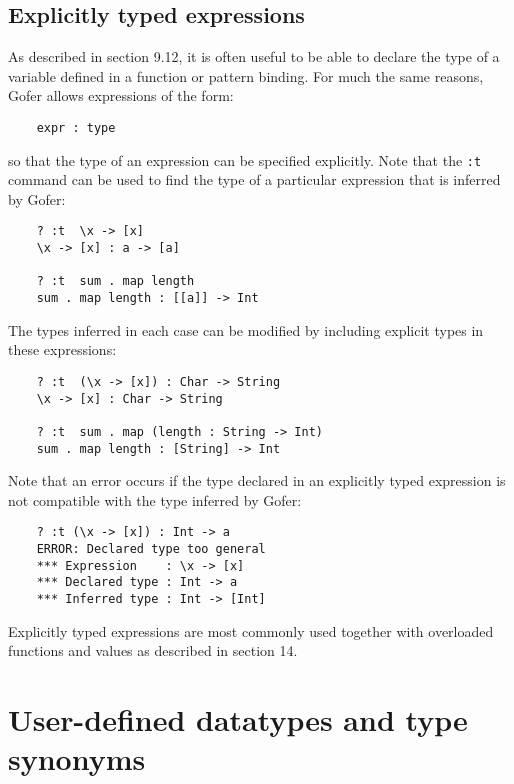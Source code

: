 \section{Explicitly typed expressions}
As described in section 9.12, it is often useful to be able to  declare
the type of a variable defined in a function or pattern  binding.   For
much the same reasons, Gofer allows expressions of the form:
\begin{verbatim}
    expr : type
\end{verbatim}
so that the type of an expression can be  specified  explicitly.   Note
that the \verb":t" command can be used  to  find  the  type  of  a  particular
expression that is inferred by Gofer:
\begin{verbatim}
    ? :t  \x -> [x]
    \x -> [x] : a -> [a]

    ? :t  sum . map length
    sum . map length : [[a]] -> Int
\end{verbatim}
The types inferred in each case can be modified by  including  explicit
types in these expressions:
\begin{verbatim}
    ? :t  (\x -> [x]) : Char -> String
    \x -> [x] : Char -> String

    ? :t  sum . map (length : String -> Int)
    sum . map length : [String] -> Int
\end{verbatim}
Note that an error occurs if the type declared in an  explicitly  typed
expression is not compatible with the type inferred by Gofer:
\begin{verbatim}
    ? :t (\x -> [x]) : Int -> a
    ERROR: Declared type too general
    *** Expression    : \x -> [x]
    *** Declared type : Int -> a
    *** Inferred type : Int -> [Int]
\end{verbatim}
Explicitly typed expressions  are  most  commonly  used  together  with
overloaded functions and values as described in section 14.


\chapter{User-defined datatypes and type synonyms}

